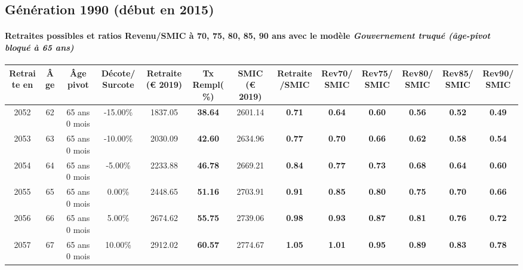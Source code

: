 \newpage 
 
\subsection{Génération 1990 (début en 2015)} 

\paragraph{Retraites possibles et ratios Revenu/SMIC à 70, 75, 80, 85, 90 ans avec le modèle \emph{Gouvernement truqué (âge-pivot bloqué à 65 ans)}}  
 
{ \scriptsize \begin{center} 
\begin{tabular}[htb]{|c|c||c|c||c|c||c||c|c|c|c|c|c|} 
\hline 
 Retraite en &  Âge &  Âge pivot &  Décote/Surcote &  Retraite (\euro{} 2019) &  Tx Rempl(\%) &  SMIC (\euro{} 2019) &  Retraite/SMIC &  Rev70/SMIC &  Rev75/SMIC &  Rev80/SMIC &  Rev85/SMIC &  Rev90/SMIC \\ 
\hline \hline 
 2052 &  62 &  65 ans 0 mois &  -15.00\% &  1837.05 &  {\bf 38.64} &  2601.14 &  {\bf {\color{red} 0.71}} &  {\bf {\color{red} 0.64}} &  {\bf {\color{red} 0.60}} &  {\bf {\color{red} 0.56}} &  {\bf {\color{red} 0.52}} &  {\bf {\color{red} 0.49}} \\ 
\hline 
 2053 &  63 &  65 ans 0 mois &  -10.00\% &  2030.09 &  {\bf 42.60} &  2634.96 &  {\bf {\color{red} 0.77}} &  {\bf {\color{red} 0.70}} &  {\bf {\color{red} 0.66}} &  {\bf {\color{red} 0.62}} &  {\bf {\color{red} 0.58}} &  {\bf {\color{red} 0.54}} \\ 
\hline 
 2054 &  64 &  65 ans 0 mois &  -5.00\% &  2233.88 &  {\bf 46.78} &  2669.21 &  {\bf {\color{red} 0.84}} &  {\bf {\color{red} 0.77}} &  {\bf {\color{red} 0.73}} &  {\bf {\color{red} 0.68}} &  {\bf {\color{red} 0.64}} &  {\bf {\color{red} 0.60}} \\ 
\hline 
 2055 &  65 &  65 ans 0 mois &  0.00\% &  2448.65 &  {\bf 51.16} &  2703.91 &  {\bf {\color{red} 0.91}} &  {\bf {\color{red} 0.85}} &  {\bf {\color{red} 0.80}} &  {\bf {\color{red} 0.75}} &  {\bf {\color{red} 0.70}} &  {\bf {\color{red} 0.66}} \\ 
\hline 
 2056 &  66 &  65 ans 0 mois &  5.00\% &  2674.62 &  {\bf 55.75} &  2739.06 &  {\bf {\color{red} 0.98}} &  {\bf {\color{red} 0.93}} &  {\bf {\color{red} 0.87}} &  {\bf {\color{red} 0.81}} &  {\bf {\color{red} 0.76}} &  {\bf {\color{red} 0.72}} \\ 
\hline 
 2057 &  67 &  65 ans 0 mois &  10.00\% &  2912.02 &  {\bf 60.57} &  2774.67 &  {\bf 1.05} &  {\bf 1.01} &  {\bf {\color{red} 0.95}} &  {\bf {\color{red} 0.89}} &  {\bf {\color{red} 0.83}} &  {\bf {\color{red} 0.78}} \\ 
\hline 
\hline 
\end{tabular} 
\end{center} } 

